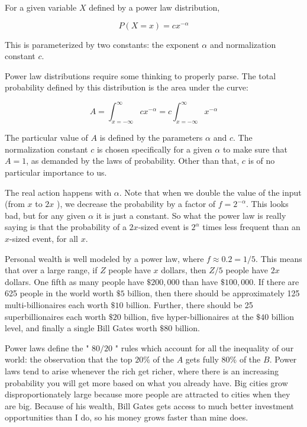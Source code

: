 \documentclass[10pt]{article}
\begin{document}

For a given variable $X$ defined by a power law distribution,

\[
P(X=x)=c x^{-\alpha}
\]

This is parameterized by two constants: the exponent $\alpha$ and normalization constant $c$.

Power law distributions require some thinking to properly parse. The total probability defined by this distribution is the area under the curve:

\[
A=\int_{x=-\infty}^{\infty} c x^{-\alpha}=c \int_{x=-\infty}^{\infty} x^{-\alpha}
\]

The particular value of $A$ is defined by the parameters $\alpha$ and $c$. The normalization constant $c$ is chosen specifically for a given $\alpha$ to make sure that $A=1$, as demanded by the laws of probability. Other than that, $c$ is of no particular importance to us.

The real action happens with $\alpha$. Note that when we double the value of the input (from $x$ to $2 x$ ), we decrease the probability by a factor of $f=2^{-\alpha}$. This looks bad, but for any given $\alpha$ it is just a constant. So what the power law is really saying is that the probability of a $2 x$-sized event is $2^{\alpha}$ times less frequent than an $x$-sized event, for all $x$.

Personal wealth is well modeled by a power law, where $f \approx 0.2=1 / 5$. This means that over a large range, if $Z$ people have $x$ dollars, then $Z / 5$ people have $2 x$ dollars. One fifth as many people have $\$ 200,000$ than have $\$ 100,000$. If there are 625 people in the world worth $\$ 5$ billion, then there should be approximately 125 multi-billionaires each worth $\$ 10$ billion. Further, there should be 25 superbillionaires each worth $\$ 20$ billion, five hyper-billionaires at the $\$ 40$ billion level, and finally a single Bill Gates worth $\$ 80$ billion.

Power laws define the " $80 / 20$ " rules which account for all the inequality of our world: the observation that the top $20 \%$ of the $A$ gets fully $80 \%$ of the $B$. Power laws tend to arise whenever the rich get richer, where there is an increasing probability you will get more based on what you already have. Big cities grow disproportionately large because more people are attracted to cities when they are big. Because of his wealth, Bill Gates gets access to much better investment opportunities than I do, so his money grows faster than mine does.
\end{document}
